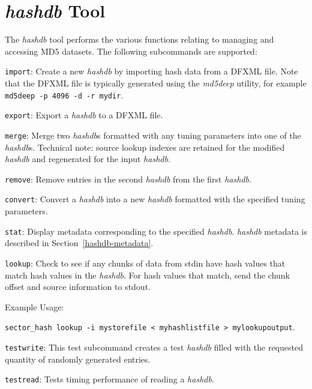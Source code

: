 \documentclass[12pt,twoside]{article}
\newcommand{\hdb}{\emph{hashdb}\xspace}
\newcommand{\mdd}{\emph{md5deep}\xspace}
\begin{document}
\section{\hdb Tool}
The \hdb tool performs the various functions relating to managing and accessing MD5 datasets.
The following subcommands are supported:
\begin{compactitem}
\item \texttt{import}:
Create a new \hdb by importing hash data from a DFXML file.
Note that the DFXML file is typically generated using the \mdd utility,
for example \texttt{md5deep -p 4096 -d -r mydir}.
\item \texttt{export}:
Export a \hdb to a DFXML file.
\item \texttt{merge}:
Merge two {\hdb}s formatted with any tuning parameters
into one of the {\hdb}s.
Technical note: source lookup indexes are retained for the modified \hdb
and regenerated for the input \hdb.
\item \texttt{remove}:
Remove entries in the second \hdb from the first \hdb.
\item \texttt{convert}:
Convert a \hdb into a new \hdb formatted with the specified tuning parameters.
\item \texttt{stat}:
Display metadata corresponding to the specified \hdb.
\hdb metadata is described in Section~\ref{hashdb-metadata}.
\item \texttt{lookup}:
Check to see if any chunks of data from stdin
have hash values that match hash values in the \hdb.
For hash values that match, send the chunk offset and source information to stdout.

Example Usage:

\texttt{sector\_hash lookup -i mystorefile < myhashlistfile > mylookupoutput}.

\item \texttt{testwrite}:
This test subcommand creates a test \hdb
filled with the requested quantity of randomly generated entries.
\item \texttt{testread}:
Tests timing performance of reading a \hdb.
\end{compactitem}
\end{document}
